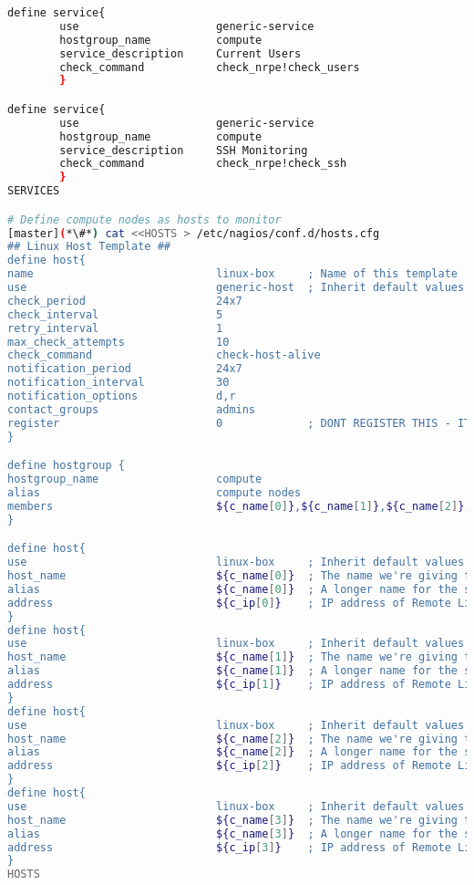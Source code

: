 \begin{lstlisting}[language=bash,keywords={},upquote=true]
define service{
        use                     generic-service
        hostgroup_name          compute
        service_description     Current Users
        check_command           check_nrpe!check_users
        }

define service{
        use                     generic-service
        hostgroup_name          compute
        service_description     SSH Monitoring
        check_command           check_nrpe!check_ssh
        }
SERVICES

# Define compute nodes as hosts to monitor
[master](*\#*) cat <<HOSTS > /etc/nagios/conf.d/hosts.cfg
## Linux Host Template ##
define host{
name                            linux-box     ; Name of this template
use                             generic-host  ; Inherit default values
check_period                    24x7
check_interval                  5
retry_interval                  1
max_check_attempts              10
check_command                   check-host-alive
notification_period             24x7
notification_interval           30
notification_options            d,r
contact_groups                  admins
register                        0             ; DONT REGISTER THIS - ITS A TEMPLATE
}

define hostgroup {
hostgroup_name                  compute
alias                           compute nodes
members                         ${c_name[0]},${c_name[1]},${c_name[2]},${c_name[3]}
}

define host{
use                             linux-box     ; Inherit default values from a template
host_name                       ${c_name[0]}  ; The name we're giving to this server
alias                           ${c_name[0]}  ; A longer name for the server
address                         ${c_ip[0]}    ; IP address of Remote Linux host
}
define host{
use                             linux-box     ; Inherit default values from a template
host_name                       ${c_name[1]}  ; The name we're giving to this server
alias                           ${c_name[1]}  ; A longer name for the server
address                         ${c_ip[1]}    ; IP address of Remote Linux host
}
define host{
use                             linux-box     ; Inherit default values from a template
host_name                       ${c_name[2]}  ; The name we're giving to this server
alias                           ${c_name[2]}  ; A longer name for the server
address                         ${c_ip[2]}    ; IP address of Remote Linux host
}
define host{
use                             linux-box     ; Inherit default values from a template
host_name                       ${c_name[3]}  ; The name we're giving to this server
alias                           ${c_name[3]}  ; A longer name for the server
address                         ${c_ip[3]}    ; IP address of Remote Linux host
}
HOSTS
\end{lstlisting}

